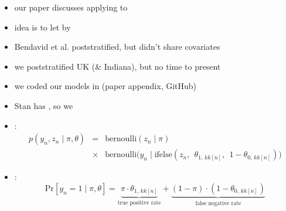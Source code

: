 \documentclass[9pt]{report}
\begin{document}
\begin{itemize}
\item our paper discusses applying  to
\item idea is to let  by
\item Bendavid et al. poststratified, but didn't share covariates
\item we poststratified UK (\& Indiana), but no time to present
\end{itemize}

\begin{itemize}
\item we coded our models in  (paper appendix, GitHub)
\item Stan has , so we
\item {}:
  {\small
  \begin{eqnarray*}
    p(y_n, z_n \mid \pi, \theta)
    & = & \textrm{bernoulli}(z_n \mid \pi)
          \\
    & \times & \textrm{bernoulli}\big(y_n \mid \textrm{ifelse}(z_n,
        \ \  \theta_{1,
      \, kk[n]},  \ \ 1 - \theta_{0, \, kk[n]})\big)
  \end{eqnarray*}}
\item {}:
  $$\textrm{Pr}\left[y_n = 1 \mid \pi, \theta\right]
    = \underbrace{\pi \cdot \theta_{1, \, kk[n]}}_{\textrm{true
        positive rate}}
    + \underbrace{(1 - \pi) \cdot (1 - \theta_{0, \,
        kk[n]})}_{\textrm{false negative rate}}$$
\end{itemize}
\end{document}
